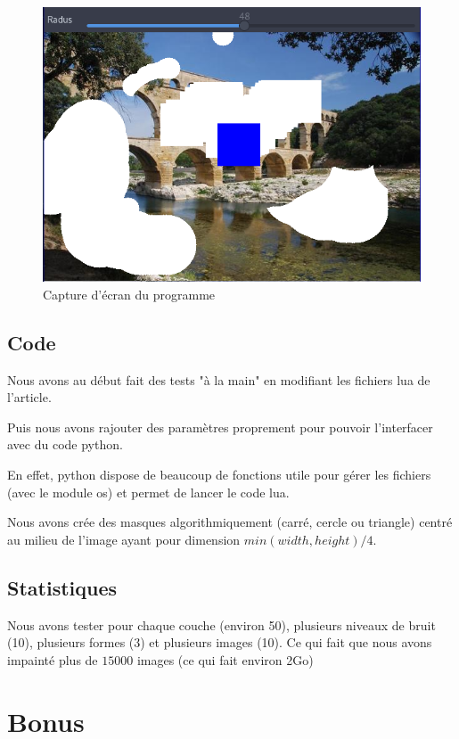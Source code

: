 \documentclass[12pt]{article}
\begin{document}
\begin{figure}[htb]
\centering
  \includegraphics[scale=0.50]{Images/editor.png}
  \caption{Capture d'écran du programme}
\end{figure}

\subsection{Code}
Nous avons au début fait des tests "à la main" en modifiant les fichiers
lua de l'article.

Puis nous avons rajouter des paramètres proprement pour pouvoir
l'interfacer avec du code python.

En effet, python dispose de beaucoup de fonctions utile pour gérer les
fichiers (avec le module os) et permet de lancer le code lua.


Nous avons crée des masques algorithmiquement (carré,
cercle ou triangle) centré au milieu de l'image ayant pour dimension
$min(width, height)/4$.

\subsection{Statistiques}
Nous avons tester pour chaque couche (environ 50), plusieurs niveaux de
bruit (10), plusieurs formes (3) et plusieurs images (10). Ce qui fait
que nous avons impainté plus de $15000$ images (ce qui fait environ 2Go) 



\newpage

\section{Bonus}
\end{document}
